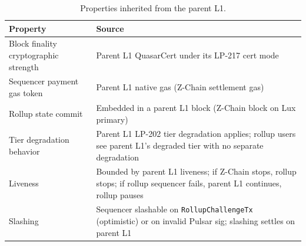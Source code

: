 \begin{table}[h]
\centering
\small
\begin{tabular}{@{}p{4cm}p{8cm}@{}}
\toprule
\textbf{Property} & \textbf{Source} \\
\midrule
Block finality cryptographic strength & Parent L1 QuasarCert under its LP-217 cert mode \\
Sequencer payment gas token & Parent L1 native gas (Z-Chain settlement gas) \\
Rollup state commit & Embedded in a parent L1 block (Z-Chain block on Lux primary) \\
Tier degradation behavior & Parent L1 LP-202 tier degradation applies; rollup users see parent L1's degraded tier with no separate degradation \\
Liveness & Bounded by parent L1 liveness; if Z-Chain stops, rollup stops; if rollup sequencer fails, parent L1 continues, rollup pauses \\
Slashing & Sequencer slashable on \texttt{RollupChallengeTx} (optimistic) or on invalid Pulsar sig; slashing settles on parent L1 \\
\bottomrule
\end{tabular}
\caption{Properties inherited from the parent L1.}
\label{tab:inheritance}
\end{table}
